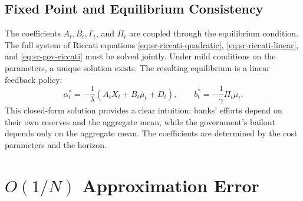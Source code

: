 \subsection{Fixed Point and Equilibrium Consistency}

The coefficients $A_t, B_t, \Gamma_t$, and $\Pi_t$ are coupled through the
equilibrium condition. The full system of Riccati equations
\eqref{eq:sr-riccati-quadratic}, \eqref{eq:sr-riccati-linear}, and
\eqref{eq:sr-gov-riccati} must be solved jointly. Under mild conditions on the
parameters, a unique solution exists. The resulting equilibrium is a linear feedback
policy:
\begin{equation}
    \alpha_t^* = -\frac{1}{\lambda}(A_t X_t + B_t \bar\mu_t + D_t), \qquad b_t^* =
    -\frac{1}{\gamma} \Pi_t \bar\mu_t.
    \label{eq:sr-equilibrium-policy}
\end{equation}
This closed-form solution provides a clear intuition: banks' efforts depend on
their own reserves and the aggregate mean, while the government's bailout depends
only on the aggregate mean. The coefficients are determined by the cost parameters
and the horizon.

\begin{table}[ht]
\centering
\small
\caption{Summary of Model Parameters and Their Economic Interpretation}
\label{tab:sr-parameters}
\end{table}

\section{$O(1/N)$ Approximation Error}
\label{sec:sr-poc}

